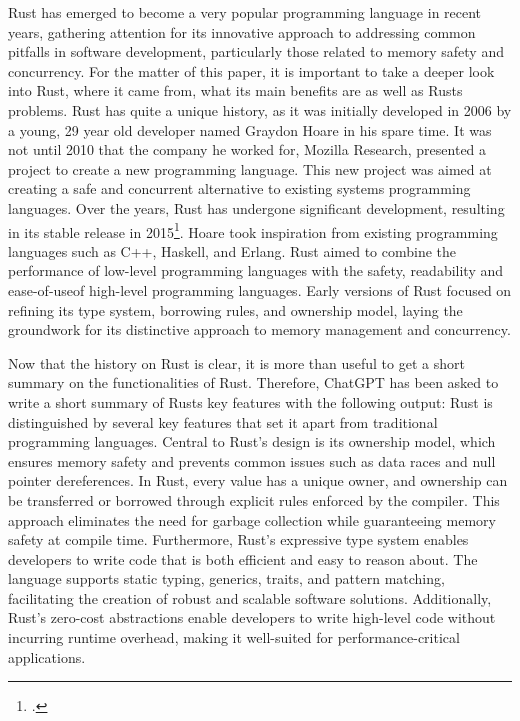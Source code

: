 Rust has emerged to become a very popular programming language in recent years, gathering attention for its innovative approach to addressing common pitfalls in software development, particularly those related to memory safety and concurrency. For the matter of this paper, it is important to take a deeper look into Rust, where it came from, what its main benefits are as well as Rusts problems. 
Rust has quite a unique history, as it was initially developed in 2006 by a young, 29 year old developer named Graydon Hoare in his spare time. It was not until 2010 that the company he worked for, Mozilla Research, presented a project to create a new programming language. This new project was aimed at creating a safe and concurrent alternative to existing systems programming languages. Over the years, Rust has undergone significant development, resulting in its stable release in 2015\footcite{thompson_how_nodate}. Hoare took inspiration from existing programming languages such as C++, Haskell, and Erlang. Rust aimed to combine the performance of low-level programming languages with the safety, readability and \dq ease-of-use\dq of high-level programming languages. Early versions of Rust focused on refining its type system, borrowing rules, and ownership model, laying the groundwork for its distinctive approach to memory management and concurrency.

Now that the history on Rust is clear, it is more than useful to get a short summary on the functionalities of Rust. Therefore, ChatGPT has been asked to write a short summary of Rusts key features with the following output:
Rust is distinguished by several key features that set it apart from traditional programming languages. Central to Rust's design is its ownership model, which ensures memory safety and prevents common issues such as data races and null pointer dereferences. In Rust, every value has a unique owner, and ownership can be transferred or borrowed through explicit rules enforced by the compiler. This approach eliminates the need for garbage collection while guaranteeing memory safety at compile time. Furthermore, Rust's expressive type system enables developers to write code that is both efficient and easy to reason about. The language supports static typing, generics, traits, and pattern matching, facilitating the creation of robust and scalable software solutions. Additionally, Rust's zero-cost abstractions enable developers to write high-level code without incurring runtime overhead, making it well-suited for performance-critical applications.

